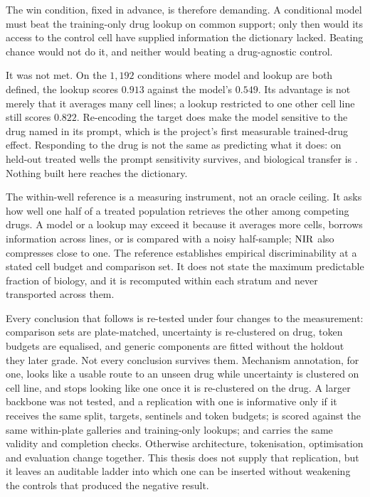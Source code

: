 The win condition, fixed in advance, is therefore demanding. A
conditional model must beat the training-only drug lookup on common support;
only then would its access to the control cell have supplied information the
dictionary lacked. Beating chance would not do it, and neither would beating a
drug-agnostic control.

It was not met. On the $1{,}192$ conditions where model and lookup
are both defined, the lookup scores $0.913$ against the model's $0.549$. Its
advantage is not merely that it averages many cell lines; a lookup restricted to
one other cell line still scores $0.822$. Re-encoding the
target does make the model sensitive to the drug named in its prompt, which is
the project's first measurable trained-drug effect. Responding to the drug is
not the same as predicting what it does: on held-out treated wells the prompt
sensitivity survives, and biological transfer is \notestablished. Nothing built
here reaches the dictionary.

\begin{scopelimit}
The within-well reference is a measuring instrument, not an oracle ceiling. It
asks how well one half of a treated population retrieves the other among
competing drugs. A model or a lookup may exceed it because it averages more
cells, borrows information across lines, or is compared with a noisy half-sample;
$\textrm{NIR}$ also compresses close to one. The reference establishes empirical
discriminability at a stated cell budget and comparison set. It does not state
the maximum predictable fraction of biology, and it is recomputed within each
stratum and never transported across them.
\end{scopelimit}

Every conclusion that follows is re-tested under four changes to the
measurement: comparison sets are plate-matched, uncertainty is re-clustered on
drug, token budgets are equalised, and generic components are fitted without the
holdout they later grade. Not every conclusion survives them. Mechanism
annotation, for one, looks like a usable route to an unseen drug while
uncertainty is clustered on cell line, and stops looking like one once it is
re-clustered on the drug. A larger backbone was not tested, and a replication
with one is informative only if it receives the same split, targets, sentinels
and token budgets; is scored against the same
within-plate galleries and training-only lookups; and carries the same validity
and completion checks. Otherwise architecture, tokenisation, optimisation and
evaluation change together. This thesis does not supply that replication, but it
leaves an auditable ladder into which one can be inserted without weakening the
controls that produced the negative result.

